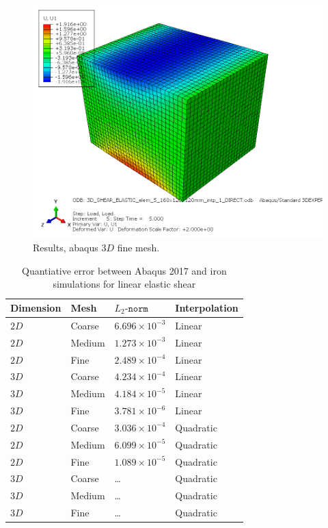 \begin{figure}[h!]
    \centering 
    \includegraphics[width=\columnwidth]{examples/example-0102/doc/figures/3D_SHEAR_ELASTIC_elem_5_160x120x120mm_intp_1_DIRECTU1.png} 
    \caption{Results, abaqus $3D$ fine mesh.}
    \label{example-0102-abaqus-3D-fig}
\end{figure}
%
\begin{table}
	\centering
    \begin{tabular}{llll}
    Dimension & Mesh 		& $L_2\texttt{-norm}$		& Interpolation \\ \hline
    $2D$      & Coarse 	& $6.696\times 10^{-3}$	& Linear \\
    $2D$      & Medium  & $1.273\times 10^{-3}$	& Linear \\
    $2D$      & Fine  	& $2.489\times 10^{-4}$	& Linear \\
    $3D$      & Coarse  & $4.234\times 10^{-4}$	& Linear \\
    $3D$      & Medium  & $4.184\times 10^{-5}$	& Linear \\
		$3D$			&	Fine 		&	$3.781\times 10^{-6}$	& Linear \\
    $2D$      & Coarse 	& $3.036\times 10^{-4}$	& Quadratic \\
    $2D$      & Medium  & $6.099\times 10^{-5}$	& Quadratic \\
    $2D$      & Fine  	& $1.089\times 10^{-5}$	& Quadratic \\
    $3D$      & Coarse  & \ldots 									& Quadratic \\
    $3D$      & Medium  & \ldots									& Quadratic \\
		$3D$			&	Fine 		&	\ldots									& Quadratic \\				
    \end{tabular}
		\caption{Quantiative error between Abaqus 2017 and iron simulations for linear elastic shear}
		\label{tab:example-0102-valid-Iron-Abaqus}
\end{table}

